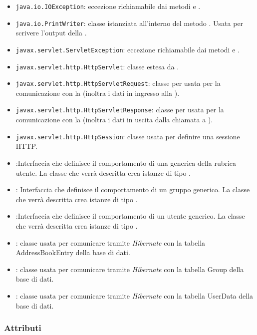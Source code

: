 \begin{itemize}
	\item \texttt{java.io.IOException}: eccezione richiamabile dai metodi  e .
	\item \texttt{java.io.PrintWriter}: classe istanziata all'interno del metodo . Usata per scrivere l'output della .
	\item \texttt{javax.servlet.ServletException}: eccezione richiamabile dai metodi  e .
	\item \texttt{javax.servlet.http.HttpServlet}: classe estesa da .
	\item \texttt{javax.servlet.http.HttpServletRequest}:  classe per usata per la comunicazione con la  (inoltra i dati in ingresso alla ).
	\item \texttt{javax.servlet.http.HttpServletResponse}: classe per usata per la comunicazione con la  (inoltra i dati in uscita dalla chiamata a ).
	\item \texttt{javax.servlet.http.HttpSession}: classe usata per definire una sessione HTTP.
	\item {}:Interfaccia che definisce il comportamento di una generica  della rubrica utente. La classe che verrà descritta crea istanze di tipo .
	\item {}:
Interfaccia che definisce il comportamento di un gruppo generico. La classe che verrà descritta crea istanze di tipo .
	\item {}:Interfaccia che definisce il comportamento di un utente generico. La classe che verrà descritta crea istanze di tipo .
	\item {}: classe usata per comunicare tramite \textit{Hibernate} con la tabella AddressBookEntry della base di dati.
	\item {}: classe usata per comunicare tramite \textit{Hibernate} con la tabella Group della base di dati.
	\item {}: classe usata per comunicare tramite \textit{Hibernate} con la tabella UserData della base di dati.
\end{itemize}

\subsubsection*{Attributi}

